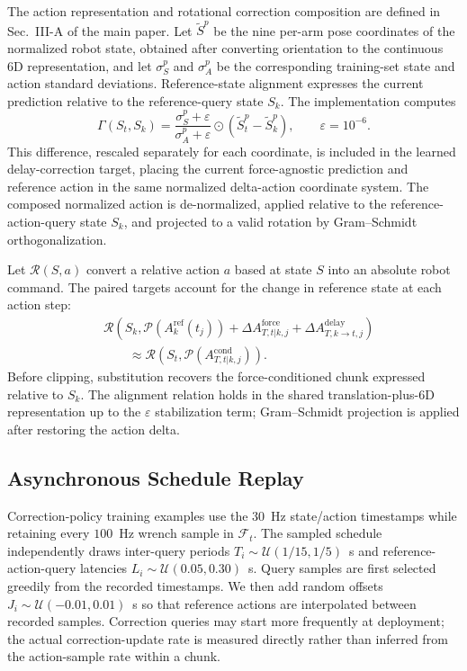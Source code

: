 \documentclass[conference]{IEEEtran}
\begin{document}
The action representation and rotational correction composition are defined in Sec.~III-A of the main paper. Let $\widetilde S^p$ be the nine per-arm pose coordinates of the normalized robot state, obtained after converting orientation to the continuous 6D representation, and let $\sigma_S^p$ and $\sigma_A^p$ be the corresponding training-set state and action standard deviations. Reference-state alignment expresses the current prediction relative to the reference-query state $S_k$. The implementation computes
\begin{equation}
    \Gamma(S_t,S_k)=
    \frac{\sigma_S^p+\varepsilon}{\sigma_A^p+\varepsilon}
    \odot(\widetilde S_t^p-\widetilde S_k^p),
    \qquad \varepsilon=10^{-6}.
    \label{eq:supp_gamma}
\end{equation}
This difference, rescaled separately for each coordinate, is included in the learned delay-correction target, placing the current force-agnostic prediction and reference action in the same normalized delta-action coordinate system. The composed normalized action is de-normalized, applied relative to the reference-action-query state $S_k$, and projected to a valid rotation by Gram--Schmidt orthogonalization.

Let $\mathcal R(S,a)$ convert a relative action $a$ based at state $S$ into an absolute robot command. The paired targets account for the change in reference state at each action step:
\begin{equation}
\begin{aligned}
    &\mathcal R\!\left(S_k,\mathcal P(A_k^{\mathrm{ref}}(t_j))
      +\Delta A_{T,t|k,j}^{\mathrm{force}}
      +\Delta A_{T,k\rightarrow t,j}^{\mathrm{delay}}\right)\\[-2pt]
    &\qquad\approx\mathcal R\!\left(S_t,
      \mathcal P(A_{T,t|k,j}^{\mathrm{cond}})\right).
\end{aligned}
    \label{eq:absolute_command_equivalence}
\end{equation}
Before clipping, substitution recovers the force-conditioned chunk expressed relative to $S_k$. The alignment relation holds in the shared translation-plus-6D representation up to the $\varepsilon$ stabilization term; Gram--Schmidt projection is applied after restoring the action delta.

\subsection{Asynchronous Schedule Replay}

Correction-policy training examples use the $30$~Hz state/action timestamps while retaining every $100$~Hz wrench sample in $\mathcal F_t$. The sampled schedule independently draws inter-query periods $T_i\sim\mathcal U(1/15,1/5)$~s and reference-action-query latencies $L_i\sim\mathcal U(0.05,0.30)$~s. Query samples are first selected greedily from the recorded timestamps. We then add random offsets $J_i\sim\mathcal U(-0.01,0.01)$~s so that reference actions are interpolated between recorded samples. Correction queries may start more frequently at deployment; the actual correction-update rate is measured directly rather than inferred from the action-sample rate within a chunk.
\end{document}
